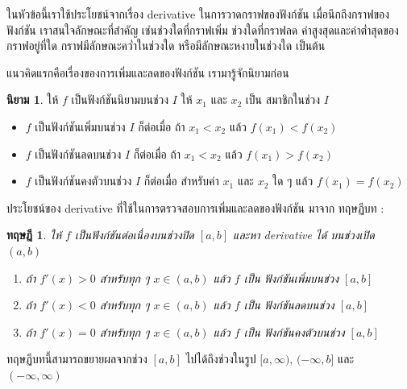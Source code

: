 \documentclass[
]{book}
\newtheorem{theorem}{ทฤษฎี}[chapter]
\theoremstyle{definition}
\newtheorem{definition}{นิยาม}[chapter]
\theoremstyle{definition}
\theoremstyle{definition}
\theoremstyle{definition}
\theoremstyle{remark}
\begin{document}
ในหัวข้อนี้เราใช้ประโยชน์จากเรื่อง derivative ในการวาดกราฟของฟังก์ชัน
เมื่อนึกถึงกราฟของฟังก์ชัน เราสนใจลักษณะที่สำคัญ เช่นช่วงใดที่กราฟเพิ่ม ช่วงใดที่กราฟลด
ค่าสูงสุดและค่าต่ำสุดของกราฟอยู่ที่ใด กราฟมีลักษณะคว่ำในช่วงใด หรือมีลักษณะหงายในช่วงใด
เป็นต้น

แนวคิดแรกคือเรื่องของการเพิ่มและลดของฟังก์ชัน เรามารู้จักนิยามก่อน

\begin{definition}

ให้ \(f\) เป็นฟังก์ชันนิยามบนช่วง \(I\) ให้ \(x_1\) และ \(x_2\) เป็น สมาชิกในช่วง \(I\)

\begin{itemize}
\item
  \(f\) เป็นฟังก์ชันเพิ่มบนช่วง \(I\) ก็ต่อเมื่อ ถ้า \(x_1 < x_2\) แล้ว \(f(x_1) < f(x_2)\)
\item
  \(f\) เป็นฟังก์ชันลดบนช่วง \(I\) ก็ต่อเมื่อ ถ้า \(x_1 < x_2\) แล้ว \(f(x_1) > f(x_2)\)
\item
  \(f\) เป็นฟังก์ชันคงตัวบนช่วง \(I\) ก็ต่อเมื่อ สำหรับค่า \(x_1\) และ \(x_2\) ใด ๆ แล้ว
  \(f(x_1) = f(x_2)\)
\end{itemize}

\end{definition}

ประโยชน์ของ derivative ที่ใช้ในการตรวจสอบการเพิ่มและลดของฟังก์ชัน มาจาก ทฤษฏีบท :

\begin{theorem}

ให้ \(f\) เป็นฟังก์ชันต่อเนื่องบนช่วงปิด \([a,b]\) และหา derivative ได้ บนช่วงเปิด
\((a,b)\)

\begin{enumerate}
\def\labelenumi{\arabic{enumi}.}
\item
  ถ้า \(f'(x) > 0\) สำหรับทุก ๆ \(x \in (a,b)\) แล้ว \(f\) เป็น ฟังก์ชันเพิ่มบนช่วง
  \([a,b]\)
\item
  ถ้า \(f'(x) < 0\) สำหรับทุก ๆ \(x \in (a,b)\) แล้ว \(f\) เป็น ฟังก์ชันลดบนช่วง
  \([a,b]\)
\item
  ถ้า \(f'(x) = 0\) สำหรับทุก ๆ \(x \in (a,b)\) แล้ว \(f\) เป็น ฟังก์ชันคงตัวบนช่วง
  \([a,b]\)
\end{enumerate}

\end{theorem}

ทฤษฏีบทนี้สามารถขยายผลจากช่วง \([a,b]\) ไปได้ถึงช่วงในรูป \([a,\infty)\),
\((-\infty,b]\) และ \((-\infty,\infty)\)
\end{document}
